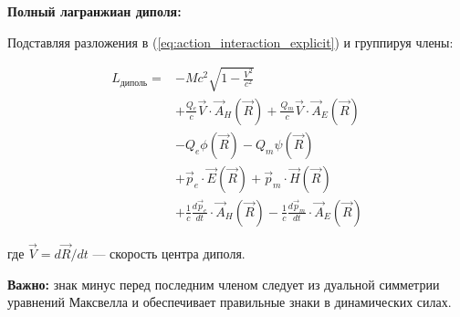 \documentclass[a4paper,10pt]{article}
\newcommand{\modblock}[1]{\colorbox{modcolor!10}{\parbox{\dimexpr\linewidth-2\fboxsep}{#1}}}
\begin{document}
\modblock{

\textbf{Полный лагранжиан диполя:}

Подставляя разложения в (\ref{eq:action_interaction_explicit}) и группируя члены:

\begin{equation}
\boxed{
\begin{aligned}
L_{\text{диполь}} = & -Mc^2\sqrt{1 - \frac{V^2}{c^2}} \\
& + \frac{Q_e}{c}\vec{V}\cdot\vec{A}_H(\vec{R}) + \frac{Q_m}{c}\vec{V}\cdot\vec{A}_E(\vec{R}) \\
& - Q_e\phi(\vec{R}) - Q_m\psi(\vec{R}) \\
& + \vec{p}_e\cdot\vec{E}(\vec{R}) + \vec{p}_m\cdot\vec{H}(\vec{R}) \\
& + \frac{1}{c}\frac{d\vec{p}_e}{dt}\cdot\vec{A}_H(\vec{R}) - \frac{1}{c}\frac{d\vec{p}_m}{dt}\cdot\vec{A}_E(\vec{R})
\end{aligned}
}
\label{eq:dipole_lagrangian_full}
\end{equation}

где $\vec{V} = d\vec{R}/dt$ --- скорость центра диполя.

\textbf{Важно:} знак минус перед последним членом следует из дуальной симметрии уравнений Максвелла и обеспечивает правильные знаки в динамических силах.

} %
\end{document}
